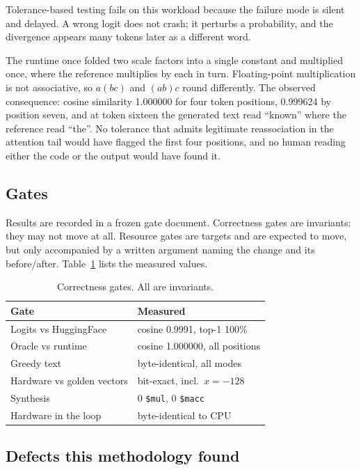 \documentclass[10pt,twocolumn]{article}
\begin{document}
Tolerance-based testing fails on this workload because the failure mode is
silent and delayed. A wrong logit does not crash; it perturbs a probability, and
the divergence appears many tokens later as a different word.

The runtime once folded two scale factors into a single constant and multiplied
once, where the reference multiplies by each in turn. Floating-point
multiplication is not associative, so $a(bc)$ and $(ab)c$ round differently. The
observed consequence: cosine similarity 1.000000 for four token positions,
0.999624 by position seven, and at token sixteen the generated text read
``known'' where the reference read ``the''. No tolerance that admits legitimate
reassociation in the attention tail would have flagged the first four positions,
and no human reading either the code or the output would have found it.

\subsection{Gates}

Results are recorded in a frozen gate document. Correctness gates are
invariants: they may not move at all. Resource gates are targets and are
expected to move, but only accompanied by a written argument naming the change
and its before/after. Table~\ref{tab:gates} lists the measured values.

\begin{table}[t]
\centering
\small
\begin{tabular}{ll}
\toprule
Gate & Measured \\
\midrule
Logits vs HuggingFace     & cosine 0.9991, top-1 100\% \\
Oracle vs runtime         & cosine 1.000000, all positions \\
Greedy text               & byte-identical, all modes \\
Hardware vs golden vectors& bit-exact, incl.\ $x=-128$ \\
Synthesis                 & 0 \texttt{\$mul}, 0 \texttt{\$macc} \\
Hardware in the loop      & byte-identical to CPU \\
\bottomrule
\end{tabular}
\caption{Correctness gates. All are invariants.}
\label{tab:gates}
\end{table}

\subsection{Defects this methodology found}
\end{document}
